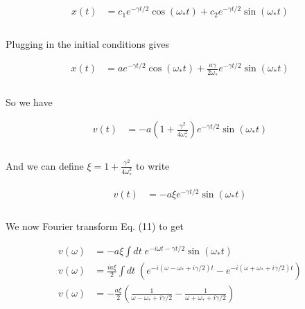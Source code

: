 \documentclass[]{article}
\begin{document}
\begin{enumerate}[a)]
\begin{equation}
\begin{aligned}
x(t) & = c_1 e^{-\gamma t/2}\cos( \omega_* t) + c_2 e^{ -\gamma t /2} \sin(\omega_* t) \\
\end{aligned}
\end{equation} \\

Plugging in the initial conditions gives

\begin{equation}
\begin{aligned}
x(t) & = a e^{-\gamma t/2}\cos( \omega_* t) + \frac{a\gamma}{2\omega_*} e^{ -\gamma t /2} \sin(\omega_* t) \\
\end{aligned}
\end{equation} \\

So we have

\begin{equation}
\begin{aligned}
v(t) & = - a \left( 1 + \frac{\gamma^2}{4 \omega_*^2} \right) e^{ -\gamma t /2} \sin(\omega_* t) \\
\end{aligned}
\end{equation} \\

And we can define $ \xi = 1 + \frac{\gamma^2}{4 \omega_*^2} $ to write 

\begin{equation}
\begin{aligned}
v(t) & = - a \xi e^{ -\gamma t /2} \sin(\omega_* t) \\
\end{aligned}
\end{equation} \\

We now Fourier transform Eq. (11) to get

\begin{equation}
\begin{aligned}
v(\omega) & = - a \xi \int dt \;  e^{ - i\omega t -\gamma t /2} \sin(\omega_* t) \\
v(\omega) & =  \frac{ i a \xi}{2 } \int dt \;  \left( e^{ - i (\omega  - \omega_* + i \gamma  /2) t} - e^{ -  i (\omega  + \omega_* + i \gamma  /2) t}  \right) \\
v(\omega) & = - \frac{  a \xi}{2 } \left( \frac{1}{ \omega  - \omega_* + i \gamma  /2} -  \frac{1}{ \omega  + \omega_* + i \gamma  /2}  \right) \\
\end{aligned}
\end{equation} \\


\end{enumerate}
\end{document}
